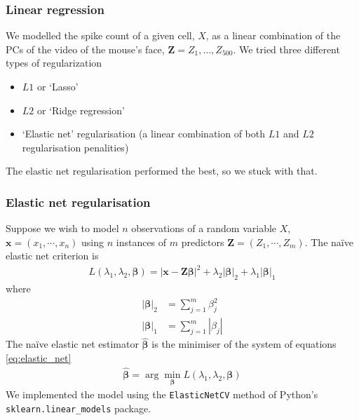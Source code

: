 \documentclass[a4paper,12pt]{article}
\theoremstyle{definition}
\begin{document}
        \subsubsection{Linear regression}
        We modelled the spike count of a given cell, $X$, as a linear combination of the PCs of the video of the mouse's face, $\mathbf{Z} = Z_1,\dots,Z_{500}$. We tried three different types of regularization
        \begin{itemize}
            \item $L1$ or `Lasso'
            \item $L2$ or `Ridge regression'
            \item `Elastic net' regularisation (a linear combination of both $L1$ and $L2$ regularisation penalities)
        \end{itemize}
        The elastic net regularisation performed the best, so we stuck with that.

        \subsubsection{Elastic net regularisation}
        Suppose we wish to model $n$ observations of a random variable $X$, $\mathbf{x} = (x_1, \cdots, x_n)$ using $n$ instances of $m$ predictors $\mathbf{Z} = (Z_1, \cdots, Z_m)$. The na\"{i}ve elastic net criterion is
        \begin{align}\label{eq:elastic_net}
            L(\lambda_1, \lambda_2, \boldsymbol{\beta}) = | \mathbf{x} - \mathbf{Z} \boldsymbol{\beta} |^2 + \lambda_2 |\boldsymbol{\beta}|_2 + \lambda_1 |\boldsymbol{\beta}|_1
        \end{align}
        where
        \begin{align}
          |\boldsymbol{\beta}|_2 &= \sum_{j=1}^m \beta_j^2 \\
          |\boldsymbol{\beta}|_1 &= \sum_{j=1}^m |\beta_j|
        \end{align}
        The na\"{i}ve elastic net estimator $\hat{\boldsymbol{\beta}}$ is the minimiser of the system of equations \ref{eq:elastic_net} \cite{zou}
        \begin{align}
          \hat{\boldsymbol{\beta}} = \arg \min_{\boldsymbol{\beta}} L(\lambda_1, \lambda_2, \boldsymbol{\beta})
        \end{align}
        We implemented the model using the \texttt{ElasticNetCV} method of Python's \\ \texttt{sklearn.linear\_models} package.
\end{document}
